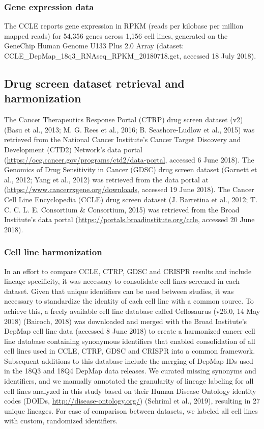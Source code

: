 \documentclass[man]{apa6}
\begin{document}
\subsubsection{Gene expression data}\label{gene-expression-data}

The CCLE reports gene expression in RPKM (reads per kilobase per million
mapped reads) for 54,356 genes across 1,156 cell lines, generated on the
GeneChip Human Genome U133 Plus 2.0 Array (dataset:
CCLE\_DepMap\_18q3\_RNAseq\_RPKM\_20180718.gct, accessed 18 July 2018).

\subsection{Drug screen dataset retrieval and
harmonization}\label{drug-screen-dataset-retrieval-and-harmonization}

The Cancer Therapeutics Response Portal (CTRP) drug screen dataset (v2)
(Basu et al., 2013; M. G. Rees et al., 2016; B. Seashore-Ludlow et al.,
2015) was retrieved from the National Cancer Institute's Cancer Target
Discovery and Development (CTD2) Network's data portal
(\url{https://ocg.cancer.gov/programs/ctd2/data-portal}, accessed 6 June
2018). The Genomics of Drug Sensitivity in Cancer (GDSC) drug screen
dataset (Garnett et al., 2012; Yang et al., 2012) was retrieved from the
data portal at (\url{https://www.cancerrxgene.org/downloads}, accessed
19 June 2018). The Cancer Cell Line Encyclopedia (CCLE) drug screen
dataset (J. Barretina et al., 2012; T. C. C. L. E. Consortium \&
Consortium, 2015) was retrieved from the Broad Institute's data portal
(\url{https://portals.broadinstitute.org/ccle}, accessed 20 June 2018).

\subsubsection{Cell line harmonization}\label{cell-line-harmonization}

In an effort to compare CCLE, CTRP, GDSC and CRISPR results and include
lineage specificity, it was necessary to consolidate cell lines screened
in each dataset. Given that unique identifiers can be used between
studies, it was necessary to standardize the identity of each cell line
with a common source. To achieve this, a freely available cell line
database called Cellosaurus (v26.0, 14 May 2018) (Bairoch, 2018) was
downloaded and merged with the Broad Institute's DepMap cell line data
(accessed 8 June 2018) to create a harmonized cancer cell line database
containing synonymous identifiers that enabled consolidation of all cell
lines used in CCLE, CTRP, GDSC and CRISPR into a common framework.
Subsequent additions to this database include the merging of DepMap IDs
used in the 18Q3 and 18Q4 DepMap data releases. We curated missing
synonyms and identifiers, and we manually annotated the granularity of
lineage labeling for all cell lines analyzed in this study based on
their Human Disease Ontology identity codes (DOIDs,
\url{http://disease-ontology.org/}) (Schriml et al., 2019), resulting in
27 unique lineages. For ease of comparison between datasets, we labeled
all cell lines with custom, randomized identifiers.
\end{document}
